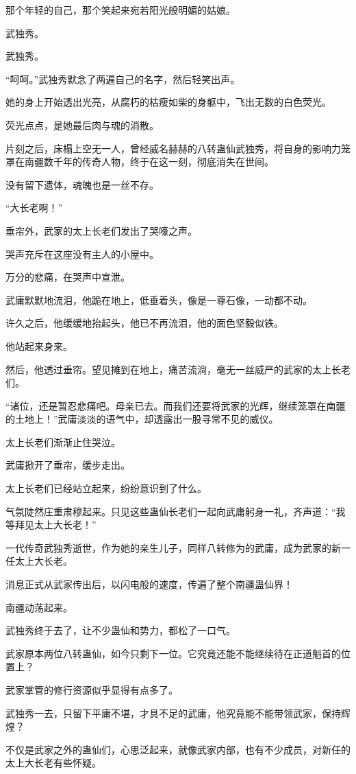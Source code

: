 \begin{this_body}
那个年轻的自己，那个笑起来宛若阳光般明媚的姑娘。

武独秀。

武独秀。

“呵呵。”武独秀默念了两遍自己的名字，然后轻笑出声。

她的身上开始透出光亮，从腐朽的枯瘦如柴的身躯中，飞出无数的白色荧光。

荧光点点，是她最后肉与魂的消散。

片刻之后，床榻上空无一人，曾经威名赫赫的八转蛊仙武独秀，将自身的影响力笼罩在南疆数千年的传奇人物，终于在这一刻，彻底消失在世间。

没有留下遗体，魂魄也是一丝不存。

“大长老啊！”

垂帘外，武家的太上长老们发出了哭嚎之声。

哭声充斥在这座没有主人的小屋中。

万分的悲痛，在哭声中宣泄。

武庸默默地流泪，他跪在地上，低垂着头，像是一尊石像，一动都不动。

许久之后，他缓缓地抬起头，他已不再流泪，他的面色坚毅似铁。

他站起来身来。

然后，他透过垂帘。望见摊到在地上，痛苦流淌，毫无一丝威严的武家的太上长老们。

“诸位，还是暂忍悲痛吧。母亲已去。而我们还要将武家的光辉，继续笼罩在南疆的土地上！”武庸淡淡的语气中，却透露出一股寻常不见的威仪。

太上长老们渐渐止住哭泣。

武庸掀开了垂帘，缓步走出。

太上长老们已经站立起来，纷纷意识到了什么。

气氛陡然庄重肃穆起来。只见这些蛊仙长老们一起向武庸躬身一礼，齐声道：“我等拜见太上大长老！”

一代传奇武独秀逝世，作为她的亲生儿子，同样八转修为的武庸，成为武家的新一任太上大长老。

消息正式从武家传出后，以闪电般的速度，传遍了整个南疆蛊仙界！

南疆动荡起来。

武独秀终于去了，让不少蛊仙和势力，都松了一口气。

武家原本两位八转蛊仙，如今只剩下一位。它究竟还能不能继续待在正道魁首的位置上？

武家掌管的修行资源似乎显得有点多了。

武独秀一去，只留下平庸不堪，才具不足的武庸，他究竟能不能带领武家，保持辉煌？

不仅是武家之外的蛊仙们，心思泛起来，就像武家内部，也有不少成员，对新任的太上大长老有些怀疑。


\end{this_body}
